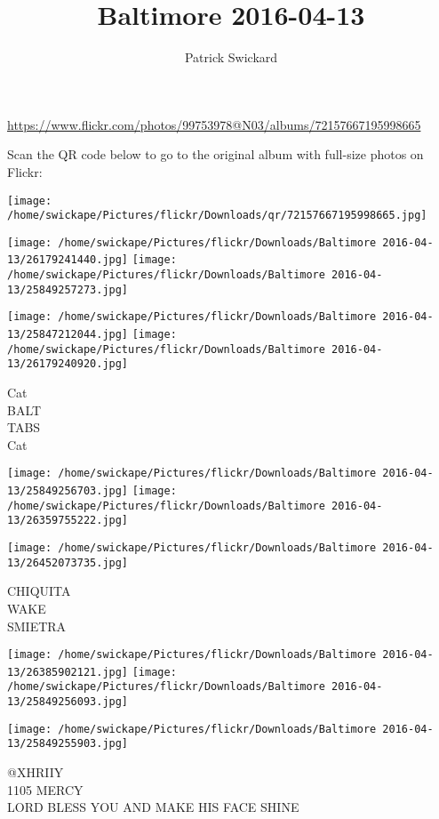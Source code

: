 \documentclass[10pt,letterpaper]{article}
\title{Baltimore 2016-04-13}
\author{Patrick Swickard}
\date{}
\begin{document}
\maketitle

\url{https://www.flickr.com/photos/99753978@N03/albums/72157667195998665}

Scan the QR code below to go to the original album with full-size photos on Flickr:

\texttt{[image: /home/swickape/Pictures/flickr/Downloads/qr/72157667195998665.jpg]}
\pagebreak

\texttt{[image: /home/swickape/Pictures/flickr/Downloads/Baltimore 2016-04-13/26179241440.jpg]}
\texttt{[image: /home/swickape/Pictures/flickr/Downloads/Baltimore 2016-04-13/25849257273.jpg]}

\texttt{[image: /home/swickape/Pictures/flickr/Downloads/Baltimore 2016-04-13/25847212044.jpg]}
\texttt{[image: /home/swickape/Pictures/flickr/Downloads/Baltimore 2016-04-13/26179240920.jpg]}

Cat\\
BALT\\
TABS\\
Cat
\pagebreak

\texttt{[image: /home/swickape/Pictures/flickr/Downloads/Baltimore 2016-04-13/25849256703.jpg]}
\texttt{[image: /home/swickape/Pictures/flickr/Downloads/Baltimore 2016-04-13/26359755222.jpg]}

\vspace{0.25in}
\texttt{[image: /home/swickape/Pictures/flickr/Downloads/Baltimore 2016-04-13/26452073735.jpg]}

CHIQUITA\\
WAKE\\
SMIETRA
\pagebreak

\texttt{[image: /home/swickape/Pictures/flickr/Downloads/Baltimore 2016-04-13/26385902121.jpg]}
\texttt{[image: /home/swickape/Pictures/flickr/Downloads/Baltimore 2016-04-13/25849256093.jpg]}

\texttt{[image: /home/swickape/Pictures/flickr/Downloads/Baltimore 2016-04-13/25849255903.jpg]}

@XHRIIY\\
1105 MERCY\\
LORD BLESS YOU AND MAKE HIS FACE SHINE
\pagebreak
\end{document}
